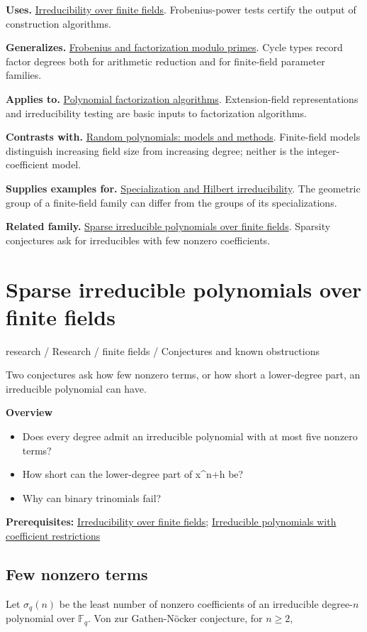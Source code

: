 \documentclass[11pt,a4paper,oneside,openany]{book}
\begin{document}
\color{black}\textbf{Uses.} \hyperlink{article:finite-field-irreducibility}{Irreducibility over finite fields}. Frobenius-power tests certify the output of construction algorithms.\par
\color{black}\textbf{Generalizes.} \hyperlink{article:frobenius}{Frobenius and factorization modulo primes}. Cycle types record factor degrees both for arithmetic reduction and for finite-field parameter families.\par
\color{black}\textbf{Applies to.} \hyperlink{article:factorization-algorithms}{Polynomial factorization algorithms}. Extension-field representations and irreducibility testing are basic inputs to factorization algorithms.\par
\color{black}\textbf{Contrasts with.} \hyperlink{article:random-models}{Random polynomials: models and methods}. Finite-field models distinguish increasing field size from increasing degree; neither is the integer-coefficient model.\par
\color{black}\textbf{Supplies examples for.} \hyperlink{article:specialization}{Specialization and Hilbert irreducibility}. The geometric group of a finite-field family can differ from the groups of its specializations.\par
\color{black}\textbf{Related family.} \hyperlink{article:sparse-finite-fields}{Sparse irreducible polynomials over finite fields}. Sparsity conjectures ask for irreducibles with few nonzero coefficients.\par
\endgroup
\chapter{Sparse irreducible polynomials over finite fields}\label{article:sparse-finite-fields}\hypertarget{article:sparse-finite-fields}{}\color{black}
{\sffamily\small\color{atlasgold}research / Research / finite fields / Conjectures and known obstructions}\par\medskip
Two conjectures ask how few nonzero terms, or how short a lower-degree part, an irreducible polynomial can have.\par\medskip
\textbf{Overview}\begin{itemize}
\item Does every degree admit an irreducible polynomial with at most five nonzero terms?
\item How short can the lower-degree part of x\textasciicircum{}n+h be?
\item Why can binary trinomials fail?
\end{itemize}
{\small\textbf{Prerequisites:} \hyperlink{article:finite-field-irreducibility}{Irreducibility over finite fields}; \hyperlink{article:finite-field-constructions}{Irreducible polynomials with coefficient restrictions}}\par
{}\section{Few nonzero terms}
\color{black} Let \(\sigma_q(n)\) be the least number of nonzero coefficients of an irreducible degree-\(n\) polynomial over \(\mathbb F_q\). Von zur Gathen-Nöcker conjecture, for \(n\ge2\),\par
\end{document}
